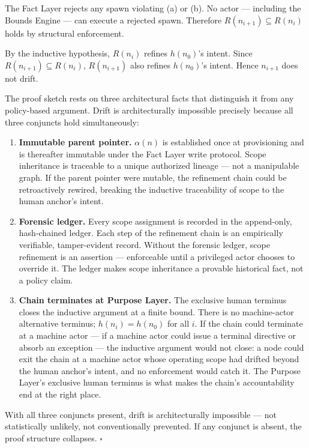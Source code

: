 The Fact Layer rejects any spawn violating (a) or (b). No actor — including the Bounds Engine — can execute a rejected spawn. Therefore $R(n_{i+1}) \subseteq R(n_i)$ holds by structural enforcement.

By the inductive hypothesis, $R(n_i)$ refines $h(n_0)$'s intent. Since $R(n_{i+1}) \subseteq R(n_i)$, $R(n_{i+1})$ also refines $h(n_0)$'s intent. Hence $n_{i+1}$ does not drift.

\medskip
The proof sketch rests on three architectural facts that distinguish it from any policy-based argument. Drift is architecturally impossible precisely because all three conjuncts hold simultaneously:

\begin{enumerate}
    \item[(1)] \textbf{Immutable parent pointer.} $\alpha(n)$ is established once at provisioning and is thereafter immutable under the Fact Layer write protocol. Scope inheritance is traceable to a unique authorized lineage — not a manipulable graph. If the parent pointer were mutable, the refinement chain could be retroactively rewired, breaking the inductive traceability of scope to the human anchor's intent.

    \item[(2)] \textbf{Forensic ledger.} Every scope assignment is recorded in the append-only, hash-chained ledger. Each step of the refinement chain is an empirically verifiable, tamper-evident record. Without the forensic ledger, scope refinement is an assertion — enforceable until a privileged actor chooses to override it. The ledger makes scope inheritance a provable historical fact, not a policy claim.

    \item[(3)] \textbf{Chain terminates at Purpose Layer.} The exclusive human terminus closes the inductive argument at a finite bound. There is no machine-actor alternative terminus; $h(n_i) = h(n_0)$ for all $i$. If the chain could terminate at a machine actor — if a machine actor could issue a terminal directive or absorb an exception — the inductive argument would not close: a node could exit the chain at a machine actor whose operating scope had drifted beyond the human anchor's intent, and no enforcement would catch it. The Purpose Layer's exclusive human terminus is what makes the chain's accountability end at the right place.
\end{enumerate}

With all three conjuncts present, drift is architecturally impossible — not statistically unlikely, not conventionally prevented. If any conjunct is absent, the proof structure collapses. $\square$

